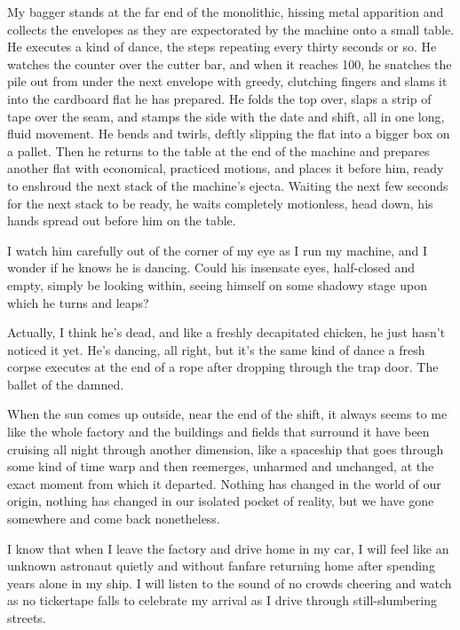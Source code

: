 My bagger stands at the far end of the monolithic, hissing metal
apparition and collects the envelopes as they are expectorated by
the machine onto a small table. He executes a kind of dance, the
steps repeating every thirty seconds or so. He watches the counter
over the cutter bar, and when it reaches 100, he snatches the pile
out from under the next envelope with greedy, clutching fingers and
slams it into the cardboard flat he has prepared. He folds the top
over, slaps a strip of tape over the seam, and stamps the side with
the date and shift, all in one long, fluid movement. He bends and
twirls, deftly slipping the flat into a bigger box on a pallet.
Then he returns to the table at the end of the machine and prepares
another flat with economical, practiced motions, and places it
before him, ready to enshroud the next stack of the machine's
ejecta. Waiting the next few seconds for the next stack to be
ready, he waits completely motionless, head down, his hands spread
out before him on the table.



I watch him carefully out of the corner of my eye as I run my
machine, and I wonder if he knows he is dancing. Could his
insensate eyes, half-closed and empty, simply be looking within,
seeing himself on some shadowy stage upon which he turns and
leaps?



Actually, I think he's dead, and like a freshly decapitated
chicken, he just hasn't noticed it yet. He's dancing,
all right, but it's the same kind of dance a fresh corpse
executes at the end of a rope after dropping through the trap door.
The ballet of the damned.



When the sun comes up outside, near the end of the shift, it always
seems to me like the whole factory and the buildings and fields
that surround it have been cruising all night through another
dimension, like a spaceship that goes through some kind of time
warp and then reemerges, unharmed and unchanged, at the exact
moment from which it departed. Nothing has changed in the world of
our origin, nothing has changed in our isolated pocket of reality,
but we have gone somewhere and come back nonetheless.



I know that when I leave the factory and drive home in my car, I
will feel like an unknown astronaut quietly and without fanfare
returning home after spending years alone in my ship. I will listen
to the sound of no crowds cheering and watch as no tickertape falls
to celebrate my arrival as I drive through still-slumbering
streets.



